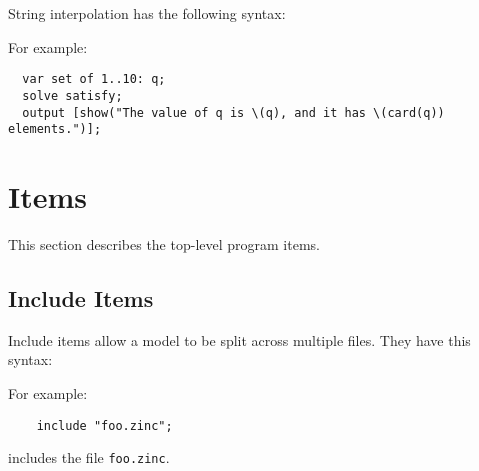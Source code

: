 \documentclass[10pt]{scrartcl}
\newcommand{\ignore}[1]{}
\begin{document}
String interpolation has the following syntax:
\begin{productions}
  \RuleStringLiteral
\end{productions}

For example:
\begin{verbatim}
  var set of 1..10: q;
  solve satisfy;
  output [show("The value of q is \(q), and it has \(card(q)) elements.")];
\end{verbatim}

\section{Items}
  \label{Items}
This section describes the top-level program items.

\ignore{
\subsection{Type-inst Synonym Items}
     \label{Type-inst Synonym Items}
Type-inst synonym items have this syntax:
\begin{productions}
    \RuleTypeInstSynItem
\end{productions}
For example:
\begin{verbatim}
    type MyInt     = int;
    type FloatPlus = (float: x where x >= 0);
    type Domain    = 1..n;
\end{verbatim}

It is a type-inst error if a type-inst synonym is declared and/or defined
more than once in a model.

Type-inst synonym items can be annotated.
Section~\ref{Annotations} has more details on annotations.

All type-inst synonyms must be defined at model-time.
}

\subsection{Include Items}
     \label{Include Items}
Include items allow a model to be split across multiple files.  They have
this syntax:
\begin{productions}
    \RuleIncludeItem
\end{productions}
For example:
\begin{verbatim}
    include "foo.zinc";
\end{verbatim}
includes the file \texttt{foo.zinc}.
\end{document}
